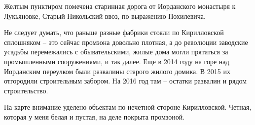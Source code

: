 Желтым пунктиром помечена старинная дорога от Иорданского монастыря к Лукьяновке, Старый Никольский ввоз, по выражению Похилевича.

Не следует думать, что раньше разные фабрики стояли по Кирилловской сплошняком – это сейчас промзона довольно плотная, а до революции заводские усадьбы перемежались с обывательскими, жилые дома могли прятаться за промышленными сооружениями, и так далее. Еще в 2014 году на горе над Иорданским переулком были развалины старого жилого домика. В 2015 их отгородили строительным забором. На 2016 год там – остатки развалин и рядом строительство.

На карте внимание уделено объектам по нечетной стороне Кирилловской. Четная, которая у меня белая и пустая, на деле покрыта промзоной.
